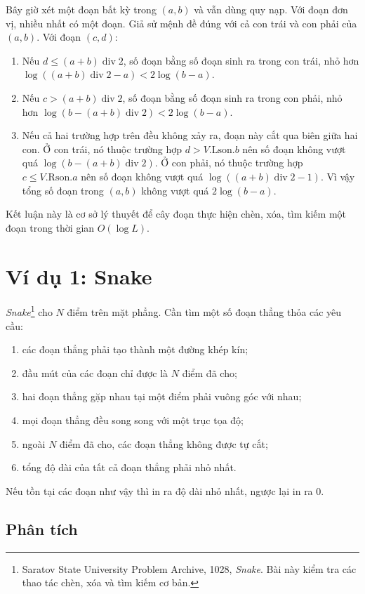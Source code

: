 \documentclass[11pt]{article}
\begin{document}
Bây giờ xét một đoạn bất kỳ trong $(a,b)$ và vẫn dùng quy nạp. Với đoạn đơn
vị, nhiều nhất có một đoạn. Giả sử mệnh đề đúng với cả con trái và con phải
của $(a,b)$. Với đoạn $(c,d)$:
\begin{enumerate}
  \item Nếu $d\le (a+b)\operatorname{div}2$, số đoạn bằng số đoạn sinh ra
  trong con trái, nhỏ hơn
  $\log((a+b)\operatorname{div}2-a)<2\log(b-a)$.
  \item Nếu $c>(a+b)\operatorname{div}2$, số đoạn bằng số đoạn sinh ra trong
  con phải, nhỏ hơn
  $\log(b-(a+b)\operatorname{div}2)<2\log(b-a)$.
  \item Nếu cả hai trường hợp trên đều không xảy ra, đoạn này cắt qua biên
  giữa hai con. Ở con trái, nó thuộc trường hợp $d>V.\mathrm{Lson}.b$ nên số
  đoạn không vượt quá $\log(b-(a+b)\operatorname{div}2)$. Ở con phải, nó
  thuộc trường hợp $c\le V.\mathrm{Rson}.a$ nên số đoạn không vượt quá
  $\log((a+b)\operatorname{div}2-1)$. Vì vậy tổng số đoạn trong $(a,b)$ không
  vượt quá $2\log(b-a)$.
\end{enumerate}

Kết luận này là cơ sở lý thuyết để cây đoạn thực hiện chèn, xóa, tìm kiếm một
đoạn trong thời gian $O(\log L)$.

\section{Ví dụ 1: Snake}

\emph{Snake}\footnote{Saratov State University Problem Archive, 1028,
\emph{Snake}. Bài này kiểm tra các thao tác chèn, xóa và tìm kiếm cơ bản.}
cho $N$ điểm trên mặt phẳng. Cần tìm một số đoạn thẳng thỏa các yêu cầu:
\begin{enumerate}
  \item các đoạn thẳng phải tạo thành một đường khép kín;
  \item đầu mút của các đoạn chỉ được là $N$ điểm đã cho;
  \item hai đoạn thẳng gặp nhau tại một điểm phải vuông góc với nhau;
  \item mọi đoạn thẳng đều song song với một trục tọa độ;
  \item ngoài $N$ điểm đã cho, các đoạn thẳng không được tự cắt;
  \item tổng độ dài của tất cả đoạn thẳng phải nhỏ nhất.
\end{enumerate}
Nếu tồn tại các đoạn như vậy thì in ra độ dài nhỏ nhất, ngược lại in ra $0$.

\subsection*{Phân tích}
\end{document}
